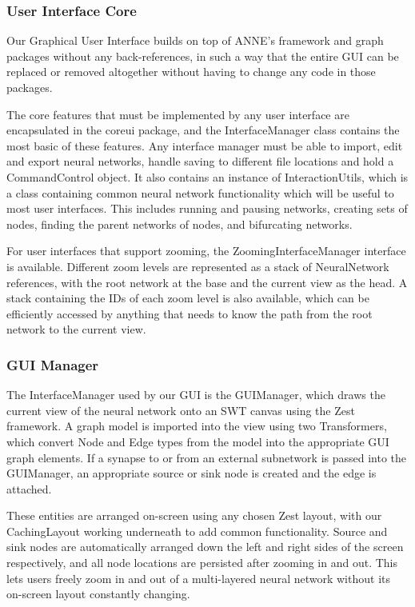 \documentclass{acm_proc_article-sp}
\begin{document}
\subsubsection{User Interface Core}
{
Our Graphical User Interface builds on top of ANNE's framework and graph packages without any back-references, in such a way that the entire GUI can be replaced or removed altogether without having to change any code in those packages.

The core features that must be implemented by any user interface are encapsulated in the coreui package, and the InterfaceManager class contains the most basic of these features. Any interface manager must be able to import, edit and export neural networks, handle saving to different file locations and hold a CommandControl object. It also contains an instance of InteractionUtils, which is a class containing common neural network functionality which will be useful to most user interfaces. This includes running and pausing networks, creating sets of nodes, finding the parent networks of nodes, and bifurcating networks.

For user interfaces that support zooming, the ZoomingInterfaceManager interface is available. Different zoom levels are represented as a stack of NeuralNetwork references, with the root network at the base and the current view as the head. A stack containing the IDs of each zoom level is also available, which can be efficiently accessed by anything that needs to know the path from the root network to the current view.
}
\subsubsection{GUI Manager}
{
The InterfaceManager used by our GUI is the GUIManager, which draws the current view of the neural network onto an SWT canvas using the Zest framework. A graph model is imported into the view using two Transformers, which convert Node and Edge types from the model into the appropriate GUI graph elements. If a synapse to or from an external subnetwork is passed into the GUIManager, an appropriate source or sink node is created and the edge is attached.

These entities are arranged on-screen using any chosen Zest layout, with our CachingLayout working underneath to add common functionality. Source and sink nodes are automatically arranged down the left and right sides of the screen respectively, and all node locations are persisted after zooming in and out. This lets users freely zoom in and out of a multi-layered neural network without its on-screen layout constantly changing.
}
\end{document}
